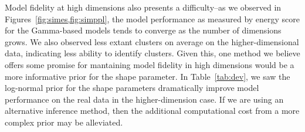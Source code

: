 Model fidelity at high dimensions also presents a difficulty--as we observed in
  Figures~\ref{fig:simes,fig:simppl}, the model performance as measured by energy score for the
  Gamma-based models tends to converge as the number of dimensions grows.  We also observed less
  extant clusters on average on the higher-dimensional data, indicating less ability to identify clusters.
  Given this, one method we believe offers some promise for mantaining model fidelity in high dimensions
  would be a more informative prior for the shape parameter.  In Table~\ref{tab:dev}, we saw the
  log-normal prior for the shape parameters dramatically improve model performance on the real data
  in the higher-dimension case.  If we are using an alternative inference method, then the additional
  computational cost from a more complex prior may be alleviated.

